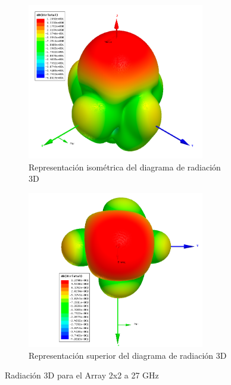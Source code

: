 \begin{figure}[H]
     \centering
     \begin{subfigure}[b]{0.7\textwidth}
         \centering
         \includegraphics[width=0.85\textwidth]{archivos/analisis/2x23/6}
         \caption{Representación isométrica del diagrama de radiación 3D}
         \label{fig:3d12x23}
     \end{subfigure}
     \hfill
     \begin{subfigure}[b]{0.7\textwidth}
         \centering
         \includegraphics[width=0.85\textwidth]{archivos/analisis/2x23/7}
         \caption{Representación superior del diagrama de radiación 3D}
         \label{fig:3d22x23}
     \end{subfigure}
     \hfill
        \caption{Radiación 3D para el Array 2x2 a 27 GHz}
        \label{fig:3d2x23}
\end{figure}

